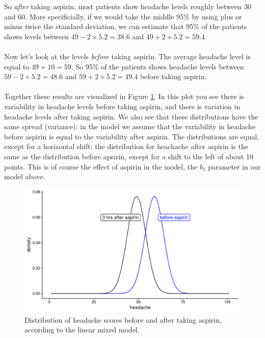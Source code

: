 \documentclass[]{book}\usepackage[]{graphicx}\usepackage[]{color}
\makeatletter
\def\maxwidth{ %
  \ifdim\Gin@nat@width>\linewidth
    \linewidth
  \else
    \Gin@nat@width
  \fi
}
\newenvironment{knitrout}{}{} %
\makeatother
\begin{document}
So \textit{after} taking aspirin, most patients show headache levels roughly between 30 and 60. More specificially, if we would take the middle 95\% by using plus or minus twice the standard deviation, we can estimate that 95\% of the patients shows levels between $49 - 2 \times 5.2 = 38.6$ and $49 + 2 \times 5.2 = 59.4$
\\
\\
Now let's look at the levels \textit{before} taking aspirin. The average headache level is equal to $49 + 10 = 59$. So 95\% of the patients shows headache levels between $59 - 2 \times 5.2 = 48.6$ and $59 + 2 \times 5.2 = 49.4$ before taking aspirin. 
\\
\\
Together these results are visualized in Figure \ref{fig:resultsanalysisprepost2}. In this plot you see there is variability in headache levels before taking aspirin, and there is variation in headache levels after taking aspirin. We also see that these distributions have the same spread (variance): in the model we assume that the variability in headache before aspirin is equal to the variability after aspirin. The distributions are equal, except for a horizontal shift: the distribution for heachache after aspirin is the same as the distribution before apsirin, except for a shift to the left of about 10 points. This is of course the effect of aspirin in the model, the $b_1$ parameter in our model above.  

\begin{knitrout}
\color{fgcolor}\begin{figure}

{\centering \includegraphics[width=\maxwidth]{figure/resultsanalysisprepost2-1} 

}

\caption[Distribution of headache scores before and after taking aspirin, according to the linear mixed model]{Distribution of headache scores before and after taking aspirin, according to the linear mixed model.}\label{fig:resultsanalysisprepost2}
\end{figure}


\end{knitrout}
\end{document}
